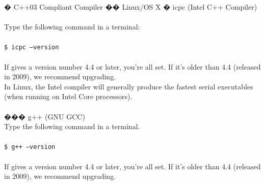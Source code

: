 \begin{easylist}[articletoc]
� C++03 Compliant Compiler
�� Linux/OS X
� icpc (Intel C++ Compiler)\\\\
Type the following command in a terminal: \\\\
\texttt{\$ icpc --version} \\\\
If gives a version number 4.4 or later, you're all set.  If it's older than 4.4 (released in 2009), we recommend upgrading. \\
In Linux, the Intel compiler will generally produce the fastest serial executables (when running on Intel Core processors). \\\\
��� g++ (GNU GCC) \\
Type the following command in a terminal.\\\\
\texttt{\$ g++ --version}\\\\
If gives a version number 4.4 or later, you're all set. If it's older than 4.4 (released in 2009), we recommend upgrading.


\end{easylist}
